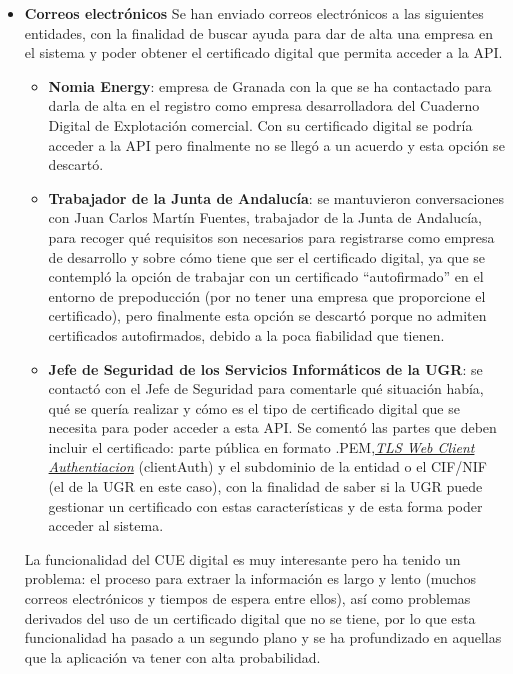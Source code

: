 \begin{itemize}
\begin{itemize}
        Las soluciones buscadas han conllevado el envío de correos electrónicos a entidades que puedan suplir este problema
        y hacer de ``empresa de desarrollo''. Los correos enviados se van a comentar a continuación.
    \end{itemize}

    \item \textbf{Correos electrónicos}
    \newline
    Se han enviado correos electrónicos a las siguientes entidades, con la finalidad de buscar ayuda para dar de alta
    una empresa en el sistema y poder obtener el certificado digital que permita acceder a la API.

    \begin{itemize}
        \item \textbf{Nomia Energy}: empresa de Granada con la que se ha contactado para darla de alta en el registro
        como empresa desarrolladora del Cuaderno Digital de Explotación comercial. Con su certificado digital se podría
        acceder a la API pero finalmente no se llegó a un acuerdo y esta opción se descartó.

        \item \textbf{Trabajador de la Junta de Andalucía}: se mantuvieron conversaciones con Juan Carlos Martín Fuentes,
        trabajador de la Junta de Andalucía, para recoger qué requisitos son necesarios para registrarse como empresa de 
        desarrollo y sobre cómo tiene que ser el certificado digital, ya que se contempló la opción de trabajar con un 
        certificado ``autofirmado'' en el entorno de prepoducción (por no tener una empresa que proporcione el certificado), 
        pero finalmente esta opción se descartó porque no admiten certificados autofirmados, debido a la poca fiabilidad que
        tienen.        

        \item \textbf{Jefe de Seguridad de los Servicios Informáticos de la UGR}: se contactó con el Jefe de Seguridad
        para comentarle qué situación había, qué se quería realizar y cómo es el tipo de certificado digital que se 
        necesita para poder acceder a esta API. Se comentó las partes que deben incluir el certificado: parte pública 
        en formato .PEM,\hyperlink{certificadoTls}{\textit{TLS Web Client Authentiacion}} (clientAuth) y el 
        subdominio de la entidad o el CIF/NIF (el de la UGR en este caso), con la finalidad de saber si la UGR puede 
        gestionar un certificado con estas características y de esta forma poder acceder al sistema.
    \end{itemize}

    La funcionalidad del CUE digital es muy interesante pero ha tenido un problema: el proceso para extraer la información 
    es largo y lento (muchos correos electrónicos y tiempos de espera entre ellos), así como problemas derivados del uso de 
    un certificado digital que no se tiene, por lo que esta funcionalidad ha pasado a un segundo plano y se ha profundizado
    en aquellas que la aplicación va tener con alta probabilidad.
\end{itemize}

